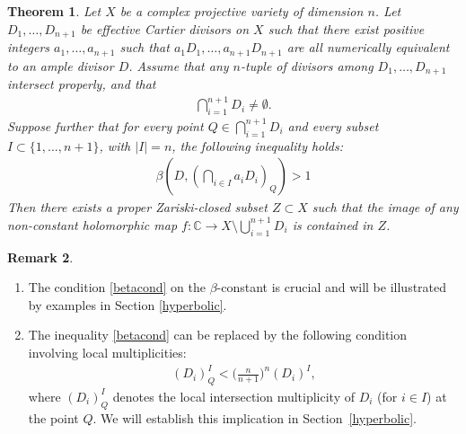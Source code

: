 \documentclass[10pt]{amsart}
\numberwithin{equation}{section}
\theoremstyle{plain}
\newtheorem{theorem}{Theorem}[section]
\theoremstyle{definition}
\newtheorem{remark}[theorem]{Remark}
\begin{document}
\begin{theorem}\label{mainTheorem2}
Let $X$ be a complex projective variety  of dimension $n$. 
Let $D_1, \ldots,D_{n+1}$ be effective Cartier  divisors on $X$ such that  there exist positive integers $a_1,\ldots, a_{n+1}$ such that $a_1D_1, \ldots, a_{n+1}D_{n+1}$ are all numerically equivalent to an ample divisor $D$.  
Assume that   any $n$-tuple of divisors among  $D_1, \ldots,D_{n+1}$ intersect properly, and that
\begin{align*}
\bigcap_{i=1}^{n+1}D_i\neq \emptyset.
\end{align*}
Suppose further that for every point 
 $Q\in  \bigcap_{i=1}^{n+1}D_i  $ and every subset $I \subset \{1,\ldots,n+1\}$, with $|I|=n$,  the following inequality holds:
 \begin{align}
\label{betacond}
\beta(D,(\bigcap_{i \in I}a_iD_i)_Q)>1
\end{align}
 Then there exists a proper Zariski-closed subset $Z\subset X$ such that the image of  any non-constant holomorphic map $f:\mathbb{C}\to X\setminus{\bigcup_{i=1}^{n+1} } D_i$  is contained in $Z$.
    \end{theorem}
\begin{remark}\label{localcondition}
\begin{enumerate}
\item The condition \eqref{betacond} on the $\beta$-constant is crucial and will be illustrated by examples in Section \ref{hyperbolic}. 
\item The inequality \eqref{betacond}  can be replaced by the following condition involving local multiplicities:
 \begin{align}\label{localmultip} 
   (D_i)^I_Q<\bigg(\frac{n}{n+1}\bigg)^n (D_i)^I, 
\end{align}
where $(D_i)^I_Q$ denotes the local intersection multiplicity of $D_i$ (for  $i\in I$) at the point  $Q$. We will establish this implication in Section~\ref{hyperbolic}.
 \end{enumerate}
\end{remark}
\end{document}
